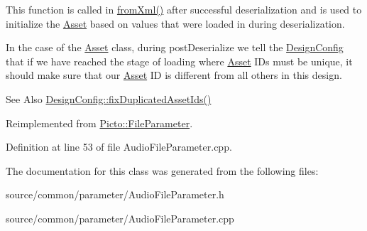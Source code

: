 This function is called in \hyperlink{class_picto_1_1_asset_a8bed4da09ecb1c07ce0dab313a9aba67}{from\-Xml()} after successful deserialization and is used to initialize the \hyperlink{class_picto_1_1_asset}{Asset} based on values that were loaded in during deserialization. 

In the case of the \hyperlink{class_picto_1_1_asset}{Asset} class, during post\-Deserialize we tell the \hyperlink{class_picto_1_1_design_config}{Design\-Config} that if we have reached the stage of loading where \hyperlink{class_picto_1_1_asset}{Asset} I\-Ds must be unique, it should make sure that our \hyperlink{class_picto_1_1_asset}{Asset} I\-D is different from all others in this design. \begin{DoxySeeAlso}{See Also}
\hyperlink{class_picto_1_1_design_config_ab57e0738b97e4358ab09530cd6815fc0}{Design\-Config\-::fix\-Duplicated\-Asset\-Ids()} 
\end{DoxySeeAlso}


Reimplemented from \hyperlink{class_picto_1_1_file_parameter_a0c5b14270f5486397d2bc0d71b64bcd4}{Picto\-::\-File\-Parameter}.



Definition at line 53 of file Audio\-File\-Parameter.\-cpp.



The documentation for this class was generated from the following files\-:\begin{DoxyCompactItemize}
\item 
source/common/parameter/Audio\-File\-Parameter.\-h\item 
source/common/parameter/Audio\-File\-Parameter.\-cpp\end{DoxyCompactItemize}

